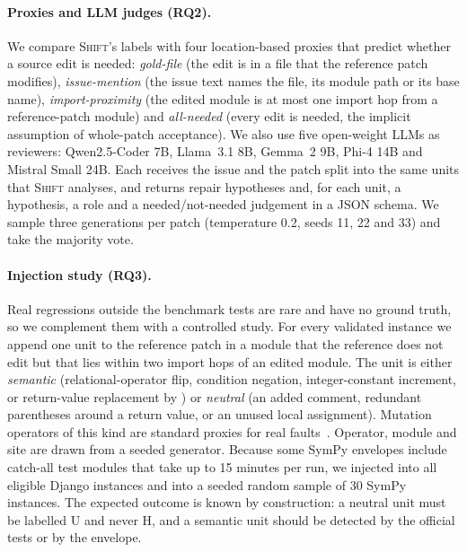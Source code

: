 \documentclass[a4paper,fleqn]{cas-sc}
\newcommand{\tool}{\textsc{Shift}}
\newcommand{\code}[1]{\texttt{\detokenize{#1}}}
\newcommand{\lab}[1]{\textsf{#1}}
\begin{document}
\paragraph{Proxies and LLM judges (RQ2).} We compare \tool{}'s labels with four location-based proxies that predict whether a source edit is needed: \emph{gold-file} (the edit is in a file that the reference patch modifies), \emph{issue-mention} (the issue text names the file, its module path or its base name), \emph{import-proximity} (the edited module is at most one import hop from a reference-patch module) and \emph{all-needed} (every edit is needed, the implicit assumption of whole-patch acceptance). We also use five open-weight LLMs as reviewers: Qwen2.5-Coder 7B, Llama~3.1 8B, Gemma~2 9B, Phi-4 14B and Mistral Small 24B. Each receives the issue and the patch split into the same units that \tool{} analyses, and returns repair hypotheses and, for each unit, a hypothesis, a role and a needed/not-needed judgement in a JSON schema. We sample three generations per patch (temperature 0.2, seeds 11, 22 and 33) and take the majority vote.

\paragraph{Injection study (RQ3).} Real regressions outside the benchmark tests are rare and have no ground truth, so we complement them with a controlled study. For every validated instance we append one unit to the reference patch in a module that the reference does not edit but that lies within two import hops of an edited module. The unit is either \emph{semantic} (relational-operator flip, condition negation, integer-constant increment, or return-value replacement by \code{None}) or \emph{neutral} (an added comment, redundant parentheses around a return value, or an unused local assignment). Mutation operators of this kind are standard proxies for real faults~\citep{jia2011mutation,just2014mutants}. Operator, module and site are drawn from a seeded generator. Because some SymPy envelopes include catch-all test modules that take up to 15 minutes per run, we injected into all eligible Django instances and into a seeded random sample of 30 SymPy instances. The expected outcome is known by construction: a neutral unit must be labelled \lab{U} and never \lab{H}, and a semantic unit should be detected by the official tests or by the envelope.
\end{document}
